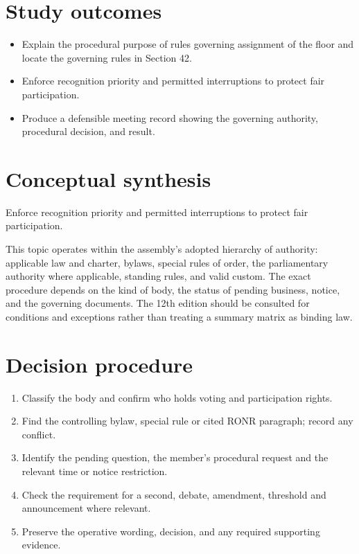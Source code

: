 \documentclass[11pt]{article}
\begin{document}
\SuiteOpen
{}
\section{Study outcomes}
\begin{itemize}[leftmargin=*,itemsep=4pt]
\item Explain the procedural purpose of rules governing assignment of the floor and locate the governing rules in Section 42.
\item Enforce recognition priority and permitted interruptions to protect fair participation.
\item Produce a defensible meeting record showing the governing authority, procedural decision, and result.
\end{itemize}

\section{Conceptual synthesis}
Enforce recognition priority and permitted interruptions to protect fair participation.

This topic operates within the assembly’s adopted hierarchy of authority: applicable law and charter, bylaws, special rules of order, the parliamentary authority where applicable, standing rules, and valid custom. The exact procedure depends on the kind of body, the status of pending business, notice, and the governing documents. The 12th edition should be consulted for conditions and exceptions rather than treating a summary matrix as binding law.
\section{Decision procedure}
\begin{enumerate}[leftmargin=*,itemsep=4pt]
\item Classify the body and confirm who holds voting and participation rights.
\item Find the controlling bylaw, special rule or cited RONR paragraph; record any conflict.
\item Identify the pending question, the member’s procedural request and the relevant time or notice restriction.
\item Check the requirement for a second, debate, amendment, threshold and announcement where relevant.
\item Preserve the operative wording, decision, and any required supporting evidence.
\end{enumerate}
\end{document}
